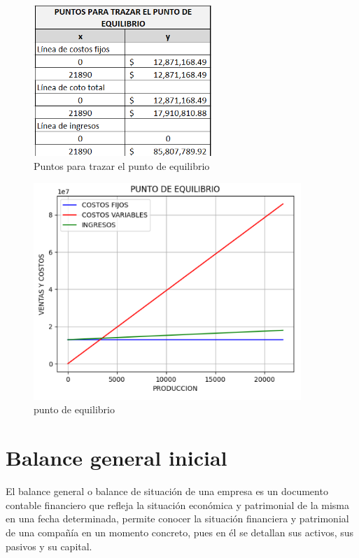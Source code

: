 \begin{figure}[H]
    \centering	
    \includegraphics[width=0.6\textwidth]{chapters/ELC_PUNTO3.png} 
    \caption{Puntos para trazar el punto de equilibrio}
\label{fig:croquis190125}
\end{figure}


\begin{figure}[H]
    \centering	
    \includegraphics[width=0.9\textwidth]{chapters/ELC_PUNTO.png} 
    \caption{punto de equilibrio}
\label{fig:croquis190125}
\end{figure}



\section{Balance general inicial}

El balance general o balance de situación de una empresa es un documento contable financiero que refleja la situación económica y patrimonial de la misma en una fecha determinada, permite conocer la situación financiera y patrimonial de una compañía en un momento concreto, pues en él se detallan sus activos, sus pasivos y su capital.

